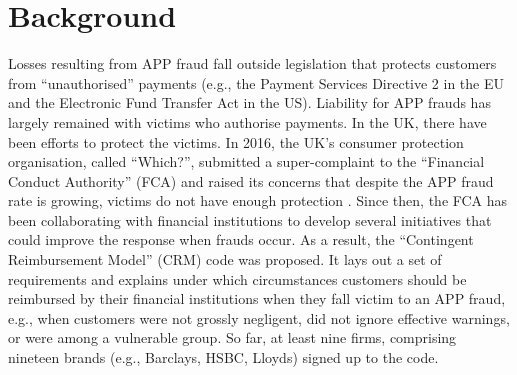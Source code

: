 

\vspace{-4.2 mm}

\section{Background}\label{sec::background}

\vspace{-1 mm}


Losses resulting from APP fraud fall outside legislation that protects customers from ``unauthorised'' payments (e.g., the Payment Services Directive 2 in the EU and the Electronic Fund Transfer Act in the US). Liability for  APP frauds has largely remained with victims who authorise payments. In the UK,  there have been efforts to protect the victims. In  2016, the UK's consumer protection organisation, called ``Which?'', submitted a super-complaint to the
 ``Financial Conduct Authority” (FCA) and raised its concerns that despite the APP fraud rate is growing, victims do not have enough protection \cite{Which?-super-complaint}.  Since then, the FCA has been collaborating with financial institutions to develop several initiatives that
could improve the response when frauds occur. As a result,  the ``Contingent Reimbursement Model'' (CRM)  code  \cite{CRM-code} was proposed. It lays out a set of requirements and explains under which circumstances customers should be reimbursed by their financial institutions when they fall victim to an APP fraud, e.g., when customers were not grossly negligent, did not ignore effective warnings, or were among a vulnerable group. So far,  at least nine firms, comprising nineteen brands (e.g., Barclays, HSBC,  Lloyds) signed up to the code. 


